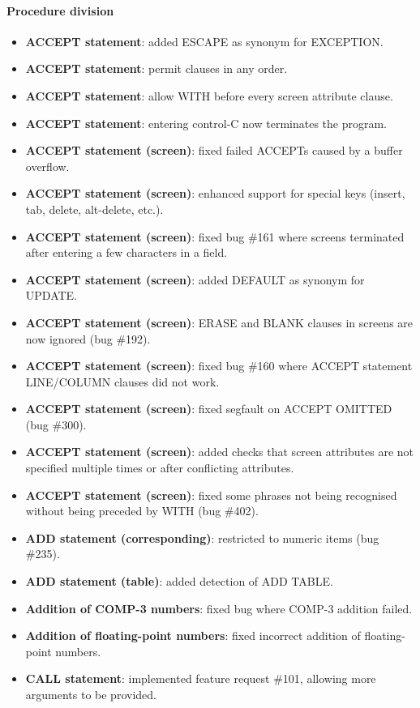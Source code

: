 \paragraph{Procedure division}
\begin{itemize}
\item \textbf{ACCEPT statement}: added ESCAPE as synonym for EXCEPTION.
\item \textbf{ACCEPT statement}: permit clauses in any order.
\item \textbf{ACCEPT statement}: allow WITH before every screen attribute clause.
\item \textbf{ACCEPT statement}: entering control-C now terminates the program.
\item \textbf{ACCEPT statement (screen)}: fixed failed ACCEPTs caused by a buffer overflow.
\item \textbf{ACCEPT statement (screen)}: enhanced support for special keys (insert, tab, delete, alt-delete, etc.).
\item \textbf{ACCEPT statement (screen)}: fixed bug \#161 where screens terminated after entering a few characters in a field.
\item \textbf{ACCEPT statement (screen)}: added DEFAULT as synonym for UPDATE.
\item \textbf{ACCEPT statement (screen)}: ERASE and BLANK clauses in screens are now ignored (bug \#192).
\item \textbf{ACCEPT statement (screen)}: fixed bug \#160 where ACCEPT statement LINE\slash{}COLUMN clauses did not work.
\item \textbf{ACCEPT statement (screen)}: fixed segfault on ACCEPT OMITTED (bug \#300).
\item \textbf{ACCEPT statement (screen)}: added checks that screen attributes are not specified multiple times or after conflicting attributes.
\item \textbf{ACCEPT statement (screen)}: fixed some phrases not being recognised without being preceded by WITH (bug \#402).
\item \textbf{ADD statement (corresponding)}: restricted to numeric items (bug \#235).
\item \textbf{ADD statement (table)}: added detection of ADD TABLE.
\item \textbf{Addition of COMP-3 numbers}: fixed bug where COMP-3 addition failed.
\item \textbf{Addition of floating-point numbers}: fixed incorrect addition of floating-point numbers.
\item \textbf{CALL statement}: implemented feature request \#101, allowing more arguments to be provided.

\end{itemize}
